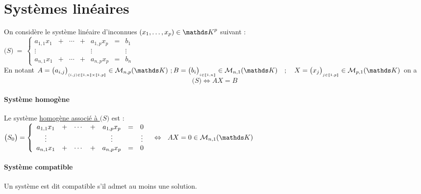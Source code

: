 	\section{Systèmes linéaires}
		On considère le système linéaire d'inconnues $(x_1 , \dots , x_p ) \in \K^p$ suivant : \\
		\hspace*{2.5cm} $ \big( S \big) ~=~ \left\{ \begin{array}{ccccccc}
		a_{1,1}x_1 & + & \cdots & + & a_{1,p} x_p & = & b_1 \\ \vdots & & & & \vdots & & \vdots \\ a_{n,1}x_1 & + & \cdots & + & a_{n,p}x_p &=&b_n
		\end{array} \right.$
		\\ En notant $A=\big(a_{i,j} \big)_{_{(i,j) \in\ent{1,n}\times\ent{1,p} }} \in \M_{n,p} (\K ) ~; \\ B = \big( b_i \big)_{_{i\in\ent{1,n}}} 
		\in\M_{n,1} (\K ) ~~~;~~~ X = \big( x_j \big)_{_{j\in\ent{1,p}}} \in\M_{p,1} (\K )$ on a \[ \big( S \big) \Leftrightarrow AX=B \] \newpage \traitd
		\paragraph{Système homogène}
			Le système \underline{homogène associé à $\big( S \big)$} est : \\ ${} \hfill \big( S_0 \big) =  \left\{ \begin{array}{ccccccc}
			a_{1,1}x_1 & + & \cdots & + & a_{1,p} x_p & = & 0 \\ \vdots & & & & \vdots & & \vdots \\ a_{n,1}x_1 & + & \cdots & + & a_{n,p}x_p &=&0
			\end{array} \right. ~~\Leftrightarrow ~~ AX=0 \in\M_{n,1} (\K ) \hfill {}$ \trait ${}$ \vspace*{-1.3cm } \traitd
		\paragraph{Système compatible} Un système est dit compatible s'il admet au moins une solution. \trait
		\vspace*{0.5cm} \\ 
